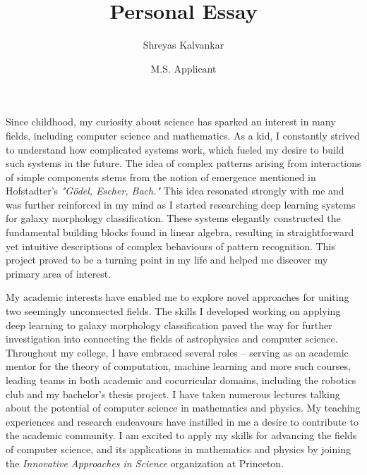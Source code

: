 \documentclass[12pt]{article}
\title{Personal Essay}
\author{Shreyas Kalvankar}
\date{M.S. Applicant}
\begin{document}
  \maketitle%
  \thispagestyle{empty}

\vspace{5pt}

Since childhood, my curiosity about science has sparked an
interest in many fields, including computer science and mathematics. As a kid, I
constantly strived to understand how complicated systems work, which fueled my
desire to build such systems in the future. The idea of complex patterns arising
from interactions of simple components stems from the notion of emergence
mentioned in Hofstadter’s \textit{"Gödel, Escher, Bach."} This idea resonated strongly
with me and was further reinforced in my mind as I started researching deep
learning systems for galaxy morphology classification. These systems elegantly
constructed the fundamental building blocks found in linear algebra, resulting
in straightforward yet intuitive descriptions of complex behaviours of pattern
recognition. This project proved to be a turning point in my life and helped me
discover my primary area of interest.

My academic interests have enabled me to explore novel approaches for uniting
two seemingly unconnected fields. The skills I developed working on applying
deep learning to galaxy morphology classification paved the way for further
investigation into connecting the fields of astrophysics and computer science.
Throughout my college, I have embraced several roles -- serving as an academic
mentor for the theory of computation, machine learning and more such courses,
leading teams in both academic and cocurricular domains, including the robotics
club and my bachelor’s thesis project. I have taken numerous lectures talking
about the potential of computer science in mathematics and physics. My teaching
experiences and research endeavours have instilled in me a desire to contribute
to the academic community. I am excited to apply my skills for advancing the
fields of computer science, and its applications in mathematics and physics by
joining the \textit{Innovative Approaches in Science} organization at Princeton.
\end{document}
